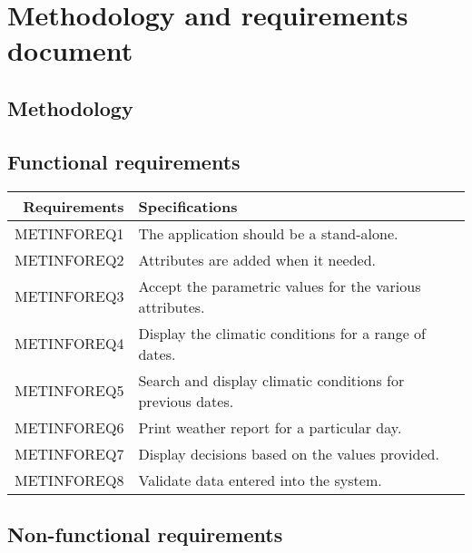 \documentclass{article}
\begin{document}
\section{Methodology and requirements document}
\label{sec:methrecdoc}

\subsection{Methodology}
\label{sec:meth}


\subsection{Functional requirements}

\begin{center}
\begin{tabular}{|r|l|}

\hline
Requirements & Specifications\\[5pt]
\hline

METINFOREQ1 &
The application should be a stand-alone. 
\\\hline

METINFOREQ2 &
Attributes are added when it needed.
\\\hline

METINFOREQ3&
Accept the parametric values for the various attributes.
\\\hline

METINFOREQ4&
Display the climatic conditions for a range of dates.
\\\hline

METINFOREQ5&
Search and display climatic conditions for previous dates.
\\\hline

METINFOREQ6&
Print weather report for a particular day. 
\\\hline

METINFOREQ7&
Display decisions based on the values provided.
\\\hline

METINFOREQ8&
Validate data entered into the system.
\\\hline
\end{tabular}
\end{center}

\subsection{Non-functional requirements}
\end{document}
